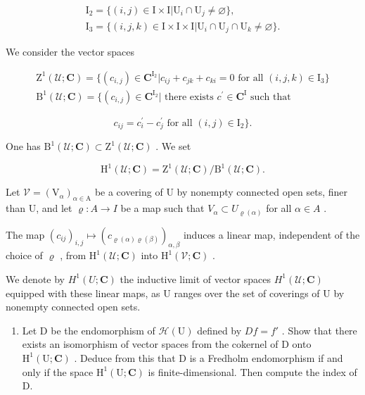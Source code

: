 \[
\begin{array}{l} \mathrm{I} _ {2} = \{(i, j) \in \mathrm{I} \times \mathrm{I} | \mathrm{U} _ {i} \cap \mathrm{U} _ {j} \neq \varnothing \}, \\ \mathrm{I} _ {3} = \{(i, j, k) \in \mathrm{I} \times \mathrm{I} \times \mathrm{I} | \mathrm{U} _ {i} \cap \mathrm{U} _ {j} \cap \mathrm{U} _ {k} \neq \varnothing \}. \end{array}
\]

We consider the vector spaces

\[
\begin{array}{l} \mathrm{Z} ^ {1} (\mathcal {U}; \mathbf {C}) = \{(c _ {i, j}) \in \mathbf {C} ^ {\mathrm{I} _ {2}} | c _ {i j} + c _ {j k} + c _ {k i} = 0 \text { for all } (i, j, k) \in \mathrm{I} _ {3} \} \\ \mathrm{B} ^ {1} (\mathcal {U}; \mathbf {C}) = \{(c _ {i, j}) \in \mathbf {C} ^ {\mathrm{I} _ {2}} | \text { there exists } c ^ {\prime} \in \mathbf {C} ^ {\mathrm{I}} \text { such that } \end{array}
\]

\[
c _ {i j} = c _ {i} ^ {\prime} - c _ {j} ^ {\prime} \text {   for all   } (i, j) \in \mathrm{I} _ {2} \}.
\]

One has \(\mathrm{B}^1 (\mathcal{U};\mathbf{C})\subset \mathrm{Z}^1 (\mathcal{U};\mathbf{C})\) . We set

\[
\mathrm{H} ^ {1} (\mathcal {U}; \mathbf {C}) = \mathrm{Z} ^ {1} (\mathcal {U}; \mathbf {C}) / \mathrm{B} ^ {1} (\mathcal {U}; \mathbf {C}).
\]

Let \(\mathcal{V}=(\mathrm{V}_{\alpha})_{\alpha\in\mathrm{A}}\) be a covering of U by nonempty connected open sets, finer than U, and let \(\varrho\colon A\to I\) be a map such that \(V_{\alpha}\subset U_{\varrho(\alpha)}\) for all \(\alpha\in A\) .

The map \((c_{ij})_{i,j} \mapsto (c_{\varrho(\alpha)\varrho(\beta)})_{\alpha,\beta}\) induces a linear map, independent of the choice of \(\varrho\) , from \(\mathrm{H}^1(\mathcal{U};\mathbf{C})\) into \(\mathrm{H}^1(\mathcal{V};\mathbf{C})\) .

We denote by \(H^{1}(U; \mathbf{C})\) the inductive limit of vector spaces \(H^{1}(\mathcal{U}; \mathbf{C})\) equipped with these linear maps, as U ranges over the set of coverings of U by nonempty connected open sets.

\begin{enumerate}
\def\labelenumi{\alph{enumi})}
\setcounter{enumi}{2}
\tightlist
\item
  Let D be the endomorphism of \(\mathcal{H}(\mathrm{U})\) defined by \(Df = f'\) . Show that there exists an isomorphism of vector spaces from the cokernel of D onto \(\mathrm{H}^1 (\mathrm{U};\mathbf{C})\) . Deduce from this that D is a Fredholm endomorphism if and only if the space \(\mathrm{H}^1 (\mathrm{U};\mathbf{C})\) is finite-dimensional. Then compute the index of D.
\end{enumerate}

